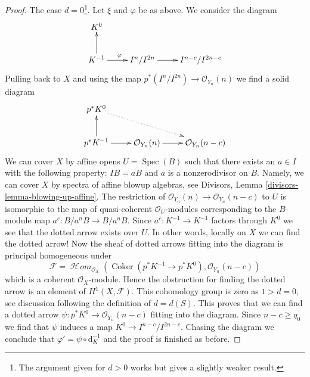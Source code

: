 \documentclass[10pt,a4paper]{amsart}
\theoremstyle{plain}
\theoremstyle{definition}
\theoremstyle{remark}
\numberwithin{equation}{subsection}
\def\Spec{\mathop{\mathrm{Spec}}}
\def\SheafHom{\mathop{\mathcal{H}\!\mathit{om}}\nolimits}
\def\Coker{\mathop{\mathrm{Coker}}}
\begin{document}
\begin{proof}
\medskip\noindent
The case $d = 0$\footnote{The argument given for $d > 0$ works but gives
a slightly weaker result.}. Let $\xi$ and $\varphi$ be as above.
We consider the diagram
$$
\xymatrix{
K^0 \\
K^{-1} \ar[u] \ar[r]^\varphi & I^n/I^{2n} \ar[r] & I^{n - c}/I^{2n - c}
}
$$
Pulling back to $X$ and using the map
$p^*(I^n/I^{2n}) \to \mathcal{O}_{Y_n}(n)$
we find a solid diagram
$$
\xymatrix{
p^*K^0 \ar@{..>}[rrd] \\
p^*K^{-1} \ar[u] \ar[r] &
\mathcal{O}_{Y_n}(n) \ar[r] &
\mathcal{O}_{Y_n}(n - c)
}
$$
We can cover $X$ by affine opens $U = \Spec(B)$ such that there
exists an $a \in I$ with the following property: $IB = aB$
and $a$ is a nonzerodivisor on $B$. Namely, we can cover
$X$ by spectra of affine blowup algebras, see
Divisors, Lemma \ref{divisors-lemma-blowing-up-affine}.
The restriction of $\mathcal{O}_{Y_n}(n) \to \mathcal{O}_{Y_n}(n - c)$
to $U$ is isomorphic to the map of quasi-coherent $\mathcal{O}_U$-modules
corresponding to the $B$-module map $a^c : B/a^nB \to B/a^nB$.
Since $a^c : K^{-1} \to K^{-1}$ factors through $K^0$ we see that
the dotted arrow exists over $U$. In other words,
locally on $X$ we can find the dotted arrow! Now the sheaf of dotted
arrows fitting into the diagram is principal homogeneous under
$$
\mathcal{F} = \SheafHom_{\mathcal{O}_X}(
\Coker(p^*K^{-1} \to p^*K^0), \mathcal{O}_{Y_n}(n - c))
$$
which is a coherent $\mathcal{O}_X$-module.
Hence the obstruction for finding the dotted arrow is an element
of $H^1(X, \mathcal{F})$. This cohomology group is zero as
$1 > d = 0$, see discussion following the definition of $d = d(S)$.
This proves that we can find a dotted arrow
$\psi : p^*K^0 \to \mathcal{O}_{Y_n}(n - c)$
fitting into the diagram. Since $n - c \geq q_0$
we find that $\psi$ induces a map $K^0 \to I^{n - c}/I^{2n - c}$.
Chasing the diagram we conclude that $\varphi' = \psi \circ \text{d}_K^{-1}$
and the proof is finished as before.
\end{proof}
\end{document}
